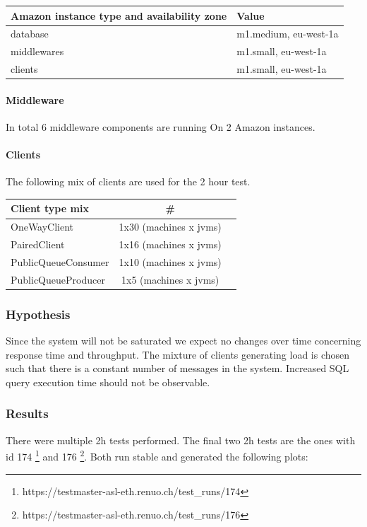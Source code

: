 \documentclass[milestone1.tex]{subfiles}
\begin{document}
\begin{tabular}{|l|l|}
\hline 
Amazon instance type and availability zone & Value \\
\hline 
database & m1.medium, eu-west-1a \\ 
middlewares & m1.small, eu-west-1a \\ 
clients & m1.small, eu-west-1a \\ 
\hline 
\end{tabular}


\paragraph{Middleware} In total 6 middleware components are running On 2 Amazon instances.

\paragraph{Clients} The following mix of clients are used for the 2 hour test.

\begin{tabular}{|l|c|c|}
\hline 
\textbf{Client type mix } & \# \\ 
\hline 
OneWayClient & 1x30 (machines x jvms)  \\ 
\hline 
PairedClient & 1x16 (machines x jvms) \\ 
\hline 
PublicQueueConsumer & 1x10 (machines x jvms) \\ 
\hline 
PublicQueueProducer & 1x5 (machines x jvms) \\ 
\hline 
\end{tabular} 


\subsubsection{Hypothesis}
Since the system will not be saturated we expect no changes over time concerning response time and throughput. The mixture of clients generating load is chosen such that there is a constant number of messages in the system. Increased SQL query execution time should not be observable.

\subsubsection{Results}
There were multiple 2h tests performed. The final two 2h tests are the ones with id 174 \footnote{https://testmaster-asl-eth.renuo.ch/test\_runs/174} and 176 \footnote{https://testmaster-asl-eth.renuo.ch/test\_runs/176}. Both run stable and generated the following plots:
\end{document}
